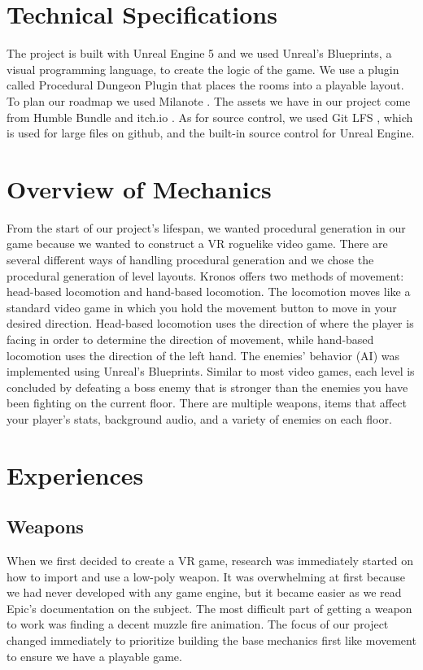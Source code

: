 \documentclass{sigchi}
\begin{document}
\section{Technical Specifications}
The project is built with Unreal Engine 5 \cite{unrealweb} and we used Unreal's Blueprints, a visual programming language, to create the logic of the game. We use a plugin called Procedural Dungeon Plugin \cite{dungeonplugin} that places the rooms into a playable layout. To plan our roadmap we used Milanote \cite{milanote}. The assets we have in our project come from Humble Bundle \cite{humble} and itch.io \cite{itch}. As for source control, we used Git LFS \cite{gitlfs}, which is used for large files on github, and the built-in source control for Unreal Engine.

\section{Overview of Mechanics}
From the start of our project's lifespan, we wanted procedural generation in our game because we wanted to construct a VR roguelike video game. There are several different ways of handling procedural generation and we chose the procedural generation of level layouts. Kronos offers two methods of movement: head-based locomotion and hand-based locomotion. The locomotion moves like a standard video game in which you hold the movement button to move in your desired direction. Head-based locomotion uses the direction of where the player is facing in order to determine the direction of movement, while hand-based locomotion uses the direction of the left hand. The enemies' behavior (AI) was implemented using Unreal's Blueprints. Similar to most video games, each level is concluded by defeating a boss enemy that is stronger than the enemies you have been fighting on the current floor. There are multiple weapons, items that affect your player's stats, background audio, and a variety of enemies on each floor.

\section{Experiences}
\subsection*{Weapons}
When we first decided to create a VR game, research was immediately started on how to import and use a low-poly weapon. It was overwhelming at first because we had never developed with any game engine, but it became easier as we read Epic's documentation on the subject. The most difficult part of getting a weapon to work was finding a decent muzzle fire animation. The focus of our project changed immediately to prioritize building the base mechanics first like movement to ensure we have a playable game.
\end{document}
